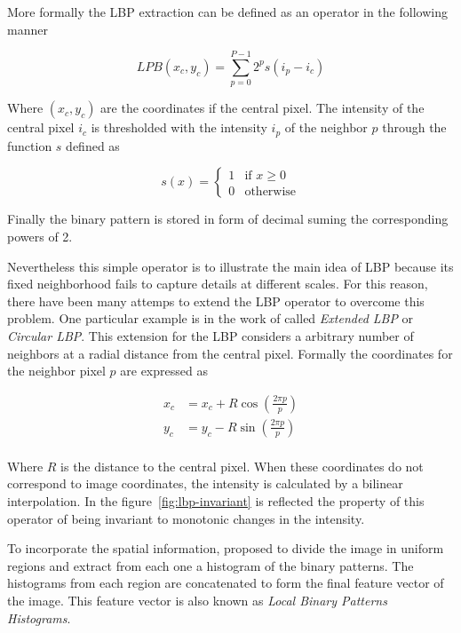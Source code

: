 More formally the LBP extraction can be defined as an operator in the following
manner

\begin{equation*}
    LPB(x_c, y_c) = \sum^{P-1}_{p=0}{2^ps(i_p - i_c)}
\end{equation*}

Where $(x_c, y_c)$ are the coordinates if the central pixel. The intensity of
the central pixel $i_c$ is thresholded with the intensity $i_p$ of the neighbor
$p$ through the function $s$ defined as 

\begin{equation*}
    s(x) =
    \begin{cases}
        1        & \text{if } x \geq 0 \\
        0        & \text{otherwise}
    \end{cases}
\end{equation*}

Finally the binary pattern is stored in form of decimal suming the corresponding
powers of 2.

Nevertheless this simple operator is to illustrate the main idea
of LBP because its fixed neighborhood fails to capture details at different
scales. For this reason, there have been many attemps to extend the LBP operator
to overcome this problem. One particular example is in the work of
\cite{ahonen} called \textit{Extended LBP} or \textit{Circular LBP}. This
extension for the LBP considers a arbitrary number of neighbors at a radial
distance from the central pixel. Formally the coordinates for the neighbor pixel
$p$ are expressed as

\begin{align*}
    x_c &= x_c + R \cos(\frac{2\pi p}{p}) \\
    y_c &= y_c - R \sin(\frac{2\pi p}{p}) \\
\end{align*}

Where $R$ is the distance to the central pixel. When these coordinates do not
correspond to image coordinates, the intensity is calculated by a bilinear
interpolation. In the figure~\ref{fig:lbp-invariant} is reflected the property
of this operator of being invariant to monotonic changes in the intensity.

To incorporate the spatial information, \cite{ahonen} proposed to divide the
image in uniform regions and extract from each one a histogram of the binary
patterns. The histograms from each region are concatenated to form the final
feature vector of the image. This feature vector is also known as
\textit{Local Binary Patterns Histograms}.

